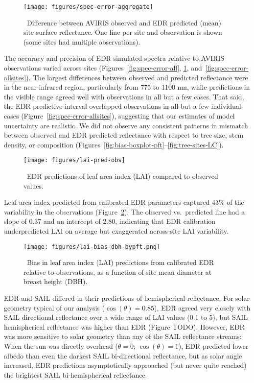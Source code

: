 \begin{figure}
  \centering
  \texttt{[image: figures/spec-error-aggregate]}
  \caption{\label{fig:spec-error-aggregate}\
    Difference between AVIRIS observed and EDR predicted (mean) site surface reflectance.
    One line per site and observation is shown (some sites had multiple observations).
  }
\end{figure}

The accuracy and precision of EDR simulated spectra relative to AVIRIS observations varied across sites (Figures~\ref{fig:spec-error-all}, \ref{fig:spec-error-aggregate}, and~\ref{fig:spec-error-allsites}).
The largest differences between observed and predicted reflectance were in the near-infrared region, particularly from 775 to 1100 \unit{nm},
while predictions in the visible range agreed well with observations in all but a few cases.
That said, the EDR predictive interval overlapped observations in all but a few individual cases (Figure~\ref{fig:spec-error-allsites}), suggesting that our estimates of model uncertainty are realistic.
We did not observe any consistent patterns in mismatch between observed and EDR predicted reflectance with respect to tree size, stem density, or composition (Figures~\ref{fig:bias-boxplot-pft}--\ref{fig:tree-sites-LC}).

\begin{figure}
  \centering
  \texttt{[image: figures/lai-pred-obs]}
  \caption{\
    EDR predictions of leaf area index (LAI) compared to observed values.
  }\label{fig:lai-pred-obs}
\end{figure}

Leaf area index predicted from calibrated EDR parameters captured 43\% of the variability in the observations (Figure~\ref{fig:lai-pred-obs}).
The observed vs.\ predicted line had a slope of 0.37 and an intercept of 2.80, indicating that EDR calibration underpredicted LAI on average but exaggerated across-site LAI variability.

\begin{figure}
  \centering
  \texttt{[image: figures/lai-bias-dbh-bypft.png]}
  \caption{\
    Bias in leaf area index (LAI) predictions from calibrated EDR relative to observations,
    as a function of site mean diameter at breast height (DBH).
  }
\end{figure}

EDR and SAIL differed in their predictions of hemispherical reflectance.
For solar geometry typical of our analysis ($\cos(\theta) = 0.85$), EDR agreed very closely with SAIL directional reflectance over a wide range of LAI values (0.1 to 5),
but SAIL hemispherical reflectance was higher than EDR (Figure TODO).
However, EDR was more sensitive to solar geometry than any of the SAIL reflectance streams:
When the sun was directly overhead ($\theta = 0$; $\cos(\theta) = 1$), EDR predicted lower albedo than even the darkest SAIL bi-directional reflectance, but as solar angle increased, EDR predictions asymptotically approached (but never quite reached) the brightest SAIL bi-hemispherical reflectance.

